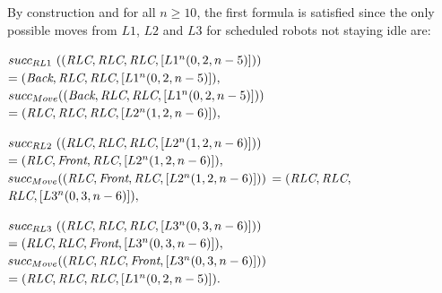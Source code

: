 By construction and for all $n\geq 10$, the first formula is satisfied
since the only possible moves from $L1$, $L2$ and $L3$
for scheduled robots not staying idle are: \\\smallskip
\small{%
\noindent
$succ_{RL1}~((\textit{RLC}, \textit{RLC}, \textit{RLC}, [L1^n(0, 2, n-5)]))$
$ = (\textit{Back}, \textit{RLC}, \textit{RLC}, [L1^n(0, 2, n-5)]), $\\ \smallskip
$ succ_{Move} (( \textit{Back}, \textit{RLC}, \textit{RLC}, [L1^n(0, 2, n-5)]))$ 
$= (\textit{RLC}, \textit{RLC}, \textit{RLC}, [L2^n(1, 2, n-6)]), $

\medskip \noindent
$succ_{RL2}~(( \textit{RLC}, \textit{RLC}, \textit{RLC}, [L2^n(1, 2, n-6)]))$
$ = (\textit{RLC}, \textit{Front}, \textit{RLC}, [L2^n(1, 2, n-6)]), $\\\smallskip
$succ_{Move} ((\textit{RLC}, \textit{Front}, \textit{RLC}, [L2^n(1, 2, n-6)]))$
$= (\textit{RLC}, \textit{RLC}, $ $\textit{RLC}, [L3^n(0, 3, n-6)]), $

\medskip \noindent
$succ_{RL3}~(( \textit{RLC}, \textit{RLC}, \textit{RLC}, [L3^n(0, 3, n-6)]))$
$ = (\textit{RLC}, \textit{RLC}, \textit{Front}, [L3^n(0, 3, n-6)]), $\\\smallskip
$succ_{Move} ((\textit{RLC}, \textit{RLC}, \textit{Front}, [L3^n(0, 3, n-6)]))$
$ = (\textit{RLC}, \textit{RLC}, \textit{RLC}, [L1^n(0, 2, n-5)]).$\\}

